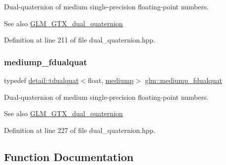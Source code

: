 Dual-\/quaternion of medium single-\/precision floating-\/point numbers.

\begin{DoxySeeAlso}{See also}
\hyperlink{group__gtc__dual__quaternion}{G\+L\+M\+\_\+\+G\+T\+X\+\_\+dual\+\_\+quaternion} 
\end{DoxySeeAlso}


Definition at line 211 of file dual\+\_\+quaternion.\+hpp.

\mbox{\label{group__gtc__dual__quaternion_gab211d24786158490e57dfa57d7744f71}} 
\subsubsection{\texorpdfstring{mediump\+\_\+fdualquat}{mediump\_fdualquat}}
{\footnotesize\ttfamily typedef \hyperlink{structglm_1_1detail_1_1tdualquat}{detail\+::tdualquat}$<$float, \hyperlink{namespaceglm_a0f04f086094c747d227af4425893f545a6416f3ea0c9025fb21ed50c4d6620482}{mediump}$>$ \hyperlink{group__gtc__dual__quaternion_gab211d24786158490e57dfa57d7744f71}{glm\+::mediump\+\_\+fdualquat}}

Dual-\/quaternion of medium single-\/precision floating-\/point numbers.

\begin{DoxySeeAlso}{See also}
\hyperlink{group__gtc__dual__quaternion}{G\+L\+M\+\_\+\+G\+T\+X\+\_\+dual\+\_\+quaternion} 
\end{DoxySeeAlso}


Definition at line 227 of file dual\+\_\+quaternion.\+hpp.



\subsection{Function Documentation}
\mbox{\label{group__gtc__dual__quaternion_gad47c752ec23a5f9924e7d7f84c40f3e5}} 

